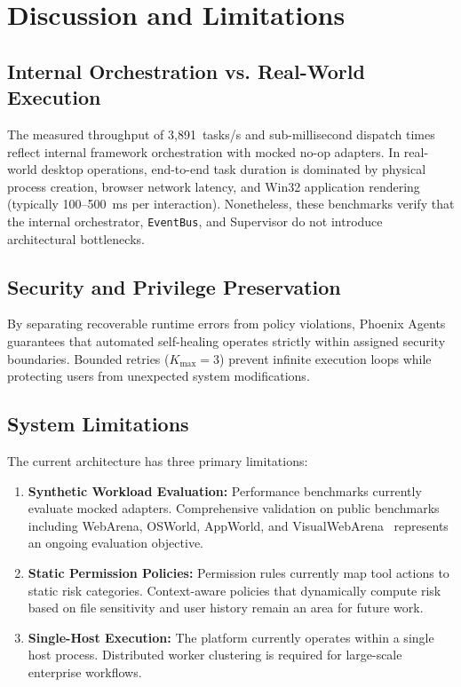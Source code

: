 \documentclass[conference]{IEEEtran}
\begin{document}
\section{Discussion and Limitations}

\subsection{Internal Orchestration vs. Real-World Execution}
The measured throughput of 3,891~tasks/s and sub-millisecond dispatch times reflect internal framework orchestration with mocked no-op adapters. In real-world desktop operations, end-to-end task duration is dominated by physical process creation, browser network latency, and Win32 application rendering (typically 100--500~ms per interaction). Nonetheless, these benchmarks verify that the internal orchestrator, \texttt{EventBus}, and Supervisor do not introduce architectural bottlenecks.

\subsection{Security and Privilege Preservation}
By separating recoverable runtime errors from policy violations, Phoenix Agents guarantees that automated self-healing operates strictly within assigned security boundaries. Bounded retries ($K_{\text{max}}=3$) prevent infinite execution loops while protecting users from unexpected system modifications.

\subsection{System Limitations}
The current architecture has three primary limitations:
\begin{enumerate}
    \item \textbf{Synthetic Workload Evaluation:} Performance benchmarks currently evaluate mocked adapters. Comprehensive validation on public benchmarks including WebArena, OSWorld, AppWorld, and VisualWebArena~\cite{nguyen2025,zhou2023,trivedi2024,koh2024} represents an ongoing evaluation objective.
    \item \textbf{Static Permission Policies:} Permission rules currently map tool actions to static risk categories. Context-aware policies that dynamically compute risk based on file sensitivity and user history remain an area for future work.
    \item \textbf{Single-Host Execution:} The platform currently operates within a single host process. Distributed worker clustering is required for large-scale enterprise workflows.
\end{enumerate}
\end{document}
